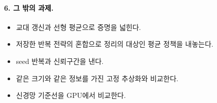 \paragraph{6. 그 밖의 과제.}
\begin{itemize}
  \item 교대 갱신과 선형 평균으로 증명을 넓힌다.
  \item 저장한 반복 전략의 혼합으로 정리의 대상인 평균 정책을 내놓는다.
  \item seed 반복과 신뢰구간을 낸다.
  \item 같은 크기와 같은 정보를 가진 고정 추상화와 비교한다.
  \item 신경망 기준선을 GPU에서 비교한다.
\end{itemize}
